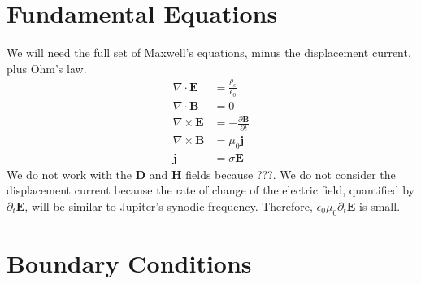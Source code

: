 \documentclass{article}
\begin{document}
\section{Fundamental Equations}
We will need the full set of Maxwell's equations, minus the displacement current, plus Ohm's law.
\begin{align}
    \nabla\cdot\mathbf{E} &= \frac{\rho_c}{\epsilon_0} \label{Gauss} \\
    \nabla\cdot\mathbf{B} &= 0 \label{DivB} \\
    \nabla\times\mathbf{E} &= -\frac{\partial\mathbf{B}}{\partial t} \label{Faraday} \\
    \nabla\times\mathbf{B} &= \mu_0\mathbf{j} \label{Ampere} \\
    \mathbf{j} &= \sigma\mathbf{E} \label{Ohm}
\end{align}
We do not work with the $\mathbf{D}$ and $\mathbf{H}$ fields because ???. We do not consider the displacement current because the rate of change of the electric field, quantified by $\partial_t\mathbf{E}$, will be similar to Jupiter's synodic frequency. Therefore, $\epsilon_0\mu_0\partial_t\mathbf{E}$ is small.

\section{Boundary Conditions}
\end{document}
